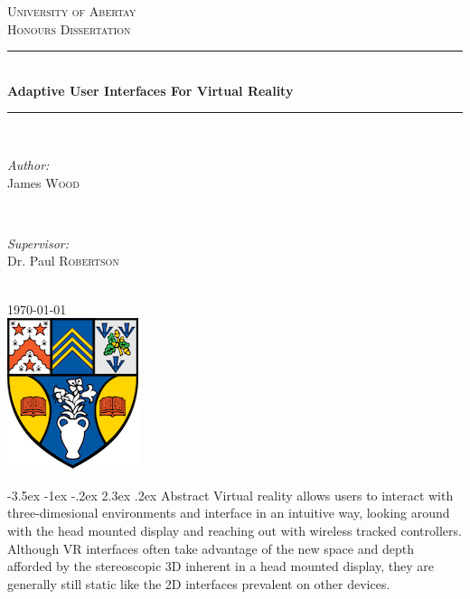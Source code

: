 \documentclass[12pt]{article}
\makeatletter
\renewcommand{\section}{\@startsection {section}{1}{\z@}%
             {-3.5ex \@plus -1ex \@minus -.2ex}%
             {2.3ex \@plus .2ex}%
             {\normalfont\Large\scshape\bfseries}}
\makeatother
\begin{document}
\begin{titlepage}

\newcommand{\HRule}{\rule{\linewidth}{0.5mm}}

\center

\textsc{\LARGE University of Abertay}\\[1.5cm]
\textsc{\Large Honours Dissertation}\\[0.5cm]

\HRule \\[0.4cm]
{ \huge \bfseries Adaptive User Interfaces For Virtual Reality}\\[0.4cm]
\HRule \\[1.5cm]

\begin{minipage}{0.4\textwidth}
\begin{flushleft} \large
\emph{Author:}\\
James \textsc{Wood}
\end{flushleft}
\end{minipage}
~
\begin{minipage}{0.4\textwidth}
\begin{flushright} \large
\emph{Supervisor:} \\
Dr. Paul \textsc{Robertson}
\end{flushright}
\end{minipage}\\[2cm]

{\large \today}\\[2cm]

\includegraphics{logo.png}\\[1cm]

\vfill

\end{titlepage}

\pagebreak

\tableofcontents
\listoffigures
\listoftables
\thispagestyle{empty}

\pagebreak

\setcounter{page}{1}

\section{Abstract}
Virtual reality allows users to interact with three-dimesional environments and interface in an intuitive way, looking around with the head mounted display and reaching out with wireless tracked controllers. Although VR interfaces often take advantage of the new space and depth afforded by the stereoscopic 3D inherent in a head mounted display, they are generally still static like the 2D interfaces prevalent on other devices.
\end{document}
